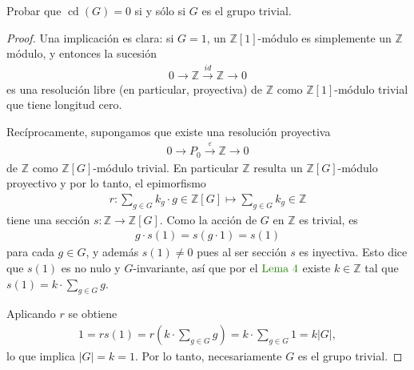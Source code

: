 \documentclass[11pt]{article}
\newcommand{\Z}{\mathbb{Z}}
\newcommand{\eps}{\varepsilon}
\newcommand{\paint}[1]{\color{color}{#1}}
\newenvironment{exercise}[2][Ejercicio]{\begin{trivlist}
\item[\hskip \labelsep \paint{{\bfseries #1}}\hskip \labelsep {\bfseries #2.}]}{\end{trivlist}}
\begin{document}
\begin{exercise}{5} Probar que $\operatorname{cd}(G) = 0$ si y sólo si $G$ es el grupo trivial.
\end{exercise}
\begin{proof} Una implicación es clara: si $G = 1$, un $\Z[1]$-módulo es simplemente un $\Z$ módulo, y entonces la sucesión
\begin{align*}
0 \to \Z \xrightarrow{id} \Z \to 0
\end{align*} 
es una resolución libre (en particular, proyectiva) de $\Z$ como $\Z[1]$-módulo trivial que tiene longitud cero. 

Recíprocamente, supongamos que existe una resolución proyectiva
\begin{align*}
0 \to P_0 \xrightarrow{\eps} \Z \to 0
\end{align*}
de $\Z$ como $\Z[G]$-módulo trivial. En particular $\Z$ resulta un $\Z[G]$-módulo proyectivo y por lo tanto, el epimorfismo
\begin{align*}
r : \sum_{g \in G}k_g \cdot g  \in \Z[G] \mapsto \sum_{g\in G}k_g \in \Z
\end{align*}
tiene una sección $s : \Z \to \Z[G]$. Como la acción de $G$ en $\Z$ es trivial, es
\begin{align*}
g \cdot s(1) = s(g \cdot 1) = s(1)
\end{align*}
para cada $g \in G$, y además $s(1) \neq 0$ pues al ser sección $s$ es inyectiva. Esto dice que $s(1)$ es no nulo y $G$-invariante, así que por el $\paint{\text{Lema $4$}}$ existe $k \in\Z$ tal que $s(1) = k \cdot \sum_{g \in G}g$. 

Aplicando $r$ se obtiene
\begin{align*}
1 = rs(1) = r\left(k \cdot \sum_{g \in G}g\right) = k \cdot \sum_{g \in G}1 = k |G|,
\end{align*}
lo que implica $|G| = k = 1$. Por lo tanto, necesariamente $G$ es el grupo trivial.
\end{proof}
\end{document}
